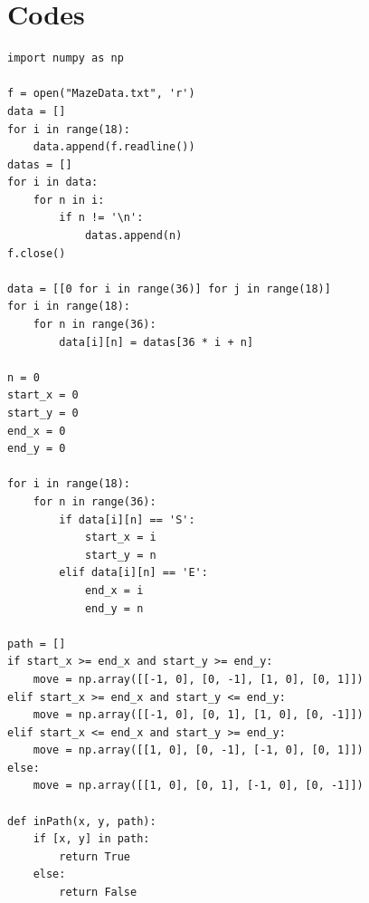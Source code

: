 \documentclass[a4paper, 11pt]{article}
\begin{document}
\section{Codes}
\lstset{language=Python}
\begin{lstlisting}
import numpy as np

f = open("MazeData.txt", 'r')
data = []
for i in range(18):
    data.append(f.readline())
datas = []
for i in data:
    for n in i:
        if n != '\n':
            datas.append(n)
f.close()

data = [[0 for i in range(36)] for j in range(18)]
for i in range(18):
    for n in range(36):
        data[i][n] = datas[36 * i + n]

n = 0
start_x = 0
start_y = 0
end_x = 0
end_y = 0

for i in range(18):
    for n in range(36):
        if data[i][n] == 'S':
            start_x = i
            start_y = n
        elif data[i][n] == 'E':
            end_x = i
            end_y = n

path = []
if start_x >= end_x and start_y >= end_y:
    move = np.array([[-1, 0], [0, -1], [1, 0], [0, 1]])
elif start_x >= end_x and start_y <= end_y:
    move = np.array([[-1, 0], [0, 1], [1, 0], [0, -1]])
elif start_x <= end_x and start_y >= end_y:
    move = np.array([[1, 0], [0, -1], [-1, 0], [0, 1]])
else:
    move = np.array([[1, 0], [0, 1], [-1, 0], [0, -1]])

def inPath(x, y, path):
    if [x, y] in path:
        return True
    else:
        return False


\end{lstlisting}
\end{document}

